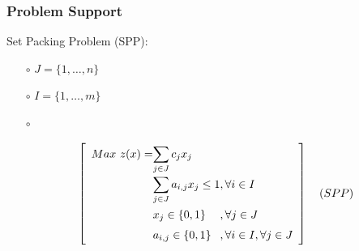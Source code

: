 \documentclass[]{beamer}
\begin{document}
% 
%

\begin{frame}
  \frametitle{Problem Support}
\vspace{-4mm}

Set Packing Problem (SPP):
%
\vspace{2ex}
\begin{itemize}
	\item [$\circ$] $J=\{1,\ldots,n\}$ 
	\item [$\circ$] $I=\{1,\ldots,m\}$
	\item [$\circ$] 
\end{itemize}	
%
\vspace{-8mm}

%
\begin{equation*} \label{eqSPP} \renewcommand{\arraystretch}{1.5}
 \quad
  \left[ \begin{array}{r@{}l@{}l}
    Max \ z(x) = & \displaystyle\sum_{j \in J} c_j x_j &\\
    & \displaystyle\sum_{j \in J} a_{i,j} x_j \leq 1 &, \forall i \in I\\
    & x_j \in \{0,1\} &, \forall j \in J\\
    & a_{i,j} \in \{0,1\} &, \forall i \in I, \forall j \in J
  \end{array} \right] \quad (SPP)
\end{equation*}


\end{frame}


%
%
\end{document}
